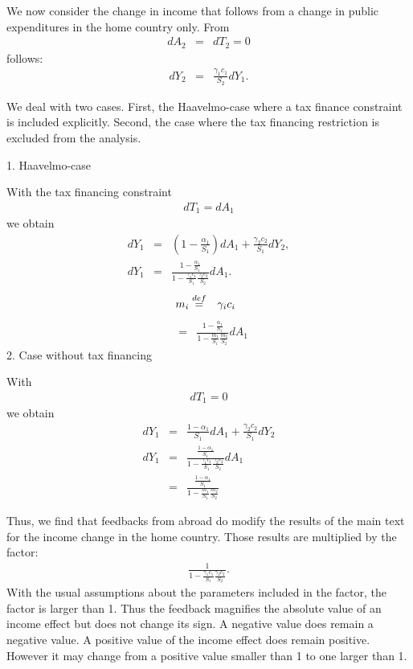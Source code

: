 \documentclass[12pt,english]{article}
\begin{document}
  We now consider the change in income that follows from a change in public expenditures in
  the home country only. From
\begin{eqnarray}
d A_2 &=& d T_2 = 0
 \end{eqnarray}
follows:
\begin{eqnarray}
 dY_2 &= & \frac{\gamma_1 c_1}{S_2 }dY_1.
 \end{eqnarray}

We deal with two cases. First, the
  Haavelmo-case where a tax finance constraint is
  included explicitly. Second, the case where the tax financing restriction is excluded from the analysis.


1. Haavelmo-case

With the tax financing constraint
 \begin{eqnarray}
 dT_1 = dA_1
\end{eqnarray}
we obtain
\begin{eqnarray}
d Y_1 & = & (1- \frac{\alpha_1}{S_1}) dA_1 +  \frac{\gamma_2 c_2}{S_1}d Y_2,  \\
dY_1 &=& \frac{1- \frac{\alpha_1}{S_1}}{1
-\frac{\gamma_1c_1}{S_1}\frac{\gamma_2c_2}{S_2}} dA_1.
\end{eqnarray}
\begin{eqnarray}
 m_i & \stackrel{def}{=} & \gamma_i c_i  \hspace{2mm}
 \end{eqnarray}
\begin{eqnarray}
&=& \frac{1- \frac{\alpha_1}{S_1}}{1
-\frac{m_1}{S_1}\frac{m_2}{S_2}} dA_1
\end{eqnarray}
2. Case without tax financing

With
\begin{eqnarray}
 dT_1 =0
 \end{eqnarray}
we obtain
\begin{eqnarray}
d Y_1 & = & \frac{1-\alpha_1}{S_1} dA_1 +  \frac{\gamma_2 c_2}{S_1}d Y_2  \\
dY_1 &
=&\frac{\frac{1-\alpha_1}{S_1}}{1-\frac{\gamma_1c_1}{S_1}\frac{\gamma_2c_2}{S_2}}
dA_1 \\
& = &
\frac{\frac{1-\alpha_1}{S_1}}{1-\frac{m_1}{S_1}\frac{m_2}{S_2}}
\end{eqnarray}

Thus, we find that feedbacks from abroad do modify the results of
the main text for the income change in the home country. Those
results are multiplied by the factor:
\begin{eqnarray}
\frac{1}{1-\frac{\gamma_1c_1}{S_1}\frac{\gamma_2c_2}{S_2}}.
\end{eqnarray}
With the usual assumptions about the parameters included in the
factor, the factor is larger than 1. Thus the feedback magnifies the
absolute value of an income effect but does not change its sign. A
negative value does remain a negative value. A positive value of the
income effect does remain positive. However it may change from a
positive value smaller than 1 to one larger than 1.
\end{document}
